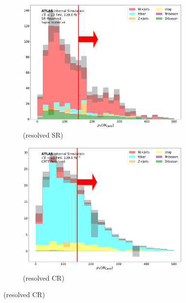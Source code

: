 \begin{figure}[htbp]
    \begin{subfigure}{0.45\textwidth}
     \includegraphics[width = 0.95\textwidth]{Figures/App_SR_CR_distributions/SR1L_Resolved/WCand_pt_N_1.pdf}
    \caption{\Wcandpt (resolved SR)}
     \end{subfigure}
    \begin{subfigure}{0.45\textwidth}
     \includegraphics[width = 0.95\textwidth]{Figures/App_SR_CR_distributions/CRTT_Resolved/WCand_pt_N_1.pdf}
     \caption{\Wcandpt (resolved \ttbar CR)}
     \end{subfigure}
     

\end{figure}
